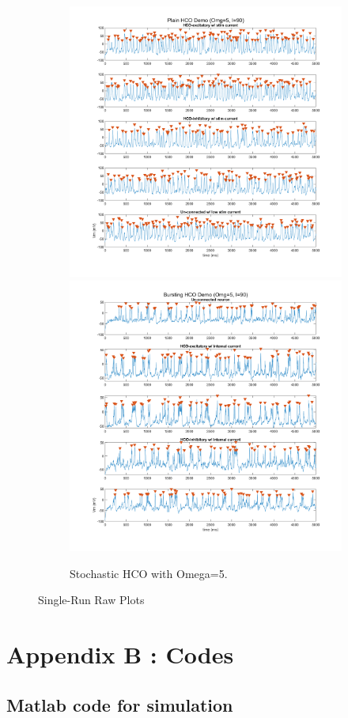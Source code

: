 \documentclass[
]{article}
\begin{document}
\begin{figure} \ContinuedFloat
  \centering
  \begin{subfigure}[b]{\textwidth}  
    \includegraphics[width=.49\textwidth]{figs/old/Fx1_F_HCO_Om5e0_NB.png}
    \includegraphics[width=.49\textwidth]{figs/old/Fx1_F_HCO_Om5e0_B.png}
    \vspace{-0.5cm} \caption{Stochastic HCO with Omega=5.}
  \end{subfigure}
  \vspace{-0.5cm} \caption{Single-Run Raw Plots }  \label{fig:figx1}
\end{figure}

\clearpage

\hypertarget{appendix-b-codes}{%
\section{Appendix B : Codes}\label{appendix-b-codes}}

\hypertarget{matlab-code-for-simulation}{%
\subsection{Matlab code for simulation}\label{matlab-code-for-simulation}}
\end{document}
